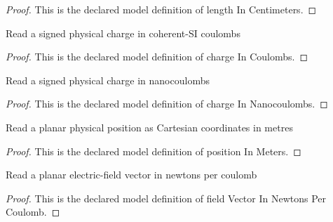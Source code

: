 \begin{proof}
  This is the declared model definition of length In Centimeters.
\end{proof}
\begin{definition}
  \label{def:physics:phyx-mini-0831:phyxminiproblems-problemphyxmini0831-chargeincoulombs}
  Read a signed physical charge in coherent-SI coulombs
\end{definition}
\begin{proof}
  This is the declared model definition of charge In Coulombs.
\end{proof}
\begin{definition}
  \label{def:physics:phyx-mini-0831:phyxminiproblems-problemphyxmini0831-chargeinnanocoulombs}
  Read a signed physical charge in nanocoulombs
\end{definition}
\begin{proof}
  This is the declared model definition of charge In Nanocoulombs.
\end{proof}
\begin{definition}
  \label{def:physics:phyx-mini-0831:phyxminiproblems-problemphyxmini0831-positioninmeters}
  Read a planar physical position as Cartesian coordinates in metres
\end{definition}
\begin{proof}
  This is the declared model definition of position In Meters.
\end{proof}
\begin{definition}
  \label{def:physics:phyx-mini-0831:phyxminiproblems-problemphyxmini0831-fieldvectorinnewtonspercoulomb}
  Read a planar electric-field vector in newtons per coulomb
\end{definition}
\begin{proof}
  This is the declared model definition of field Vector In Newtons Per Coulomb.
\end{proof}
